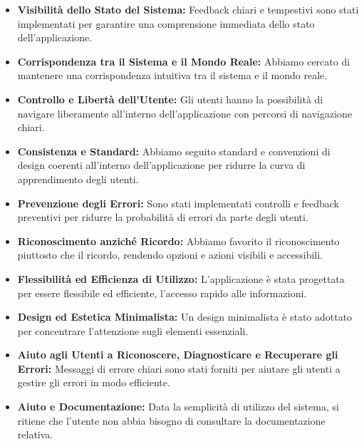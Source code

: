 \begin{itemize}
    \item \textbf{Visibilità dello Stato del Sistema:} Feedback chiari e tempestivi sono stati implementati per garantire una comprensione immediata dello stato dell'applicazione.
    
    \item \textbf{Corrispondenza tra il Sistema e il Mondo Reale:} Abbiamo cercato di mantenere una corrispondenza intuitiva tra il sistema e il mondo reale.
  
    \item \textbf{Controllo e Libertà dell'Utente:} Gli utenti hanno la possibilità di navigare liberamente all'interno dell'applicazione con percorsi di navigazione chiari.
  
    \item \textbf{Consistenza e Standard:} Abbiamo seguito standard e convenzioni di design coerenti all'interno dell'applicazione per ridurre la curva di apprendimento degli utenti.
  
    \item \textbf{Prevenzione degli Errori:} Sono stati implementati controlli e feedback preventivi per ridurre la probabilità di errori da parte degli utenti.
  
    \item \textbf{Riconoscimento anziché Ricordo:} Abbiamo favorito il riconoscimento piuttosto che il ricordo, rendendo opzioni e azioni visibili e accessibili.
  
    \item \textbf{Flessibilità ed Efficienza di Utilizzo:} L'applicazione è stata progettata per essere flessibile ed efficiente, l'accesso rapido alle informazioni.
  
    \item \textbf{Design ed Estetica Minimalista:} Un design minimalista è stato adottato per concentrare l'attenzione sugli elementi essenziali.
  
    \item \textbf{Aiuto agli Utenti a Riconoscere, Diagnosticare e Recuperare gli Errori:} Messaggi di errore chiari sono stati forniti per aiutare gli utenti a gestire gli errori in modo efficiente.
  
    \item \textbf{Aiuto e Documentazione:} Data la semplicità di utilizzo del sistema, si ritiene che l'utente non abbia bisogno di consultare la documentazione relativa.
  \end{itemize}
  

